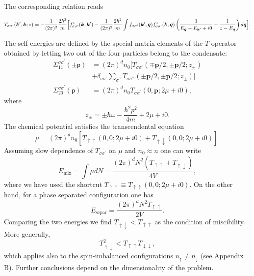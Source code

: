 \documentclass[reprint,superscriptaddress,showpacs,nofootinbib,aps,pra]{revtex4-1}
\begin{document}
The corresponding relation reads
\begin{widetext}
\begin{equation}
\label{Vert3}
T_{\sigma\sigma^\prime}(\bm k^\prime,\bm k; z)=-\frac{1}{(2\pi)^2}\frac{2\hbar^2}{m}\Bigl [f_{\sigma\sigma^\prime}^{\ast}(\bm k,\bm k^\prime)-
\frac{1}{(2\pi)^2}\frac{2\hbar^2}{m}\int f_{\sigma\sigma^\prime}(\bm k^\prime,\bm q)f_{\sigma\sigma^\prime}^{\ast}(\bm k,\bm q)\left (\frac{1}{E_{\bm q}-E_{\bm k^\prime}+i0}+\frac{1}{z-E_{\bm q}}\right)d\bm q\Bigr].
\end{equation}
\end{widetext}  
The self-energies are defined by the special matrix elements of the $T$-operator obtained by letting two out of the four particles belong to the condensate:
\begin{equation}
\label{SigmaViaTs}
\begin{split}
\Sigma^{\sigma\sigma^\prime}_{11}(\pm\mathsf p)&=(2\pi)^d n_0 [T_{\sigma\sigma^\prime}(\mp\bm p/2,\pm\bm p/2;z_\pm)\\
&+\delta_{\sigma\sigma^\prime}\sum_{\sigma^{\prime\prime}}T_{\sigma\sigma^{\prime\prime}}(\pm\bm p/2,\pm\bm p/2;z_\pm)]\\
\Sigma^{\sigma\sigma^\prime}_{20}(\mathsf p)&=(2\pi)^d n_0 T_{\sigma\sigma^\prime}(0,\bm p;2\mu+i0),
\end{split}
\end{equation}
where
\begin{equation}
z_\pm=\pm\hbar\omega-
\frac{\hbar^2 p^2}{4m}+2\mu+ i0.
\end{equation}
The chemical potential satisfies the transcendental equation
\begin{equation}
\label{mu}
\mu=(2\pi)^d n_0[T_{\uparrow\uparrow}(0,0; 2\mu+i0)+T_{\uparrow\downarrow}(0,0; 2\mu+i0)].
\end{equation}
Assuming slow dependence of  $T_{\sigma\sigma^\prime}$ on $\mu$ and $n_0\approx n$ one can write
\begin{equation}
E_{\mathrm{mix}}=\int \mu dN=\frac{(2\pi)^dN^2 (T_{\uparrow\uparrow}+T_{\uparrow\downarrow})}{4V},
\end{equation}
where we have used the shortcut $T_{\uparrow\uparrow}\equiv T_{\uparrow\uparrow}(0,0; 2\mu+i0)$. On the other hand, for a phase separated configuration one has
\begin{equation}
E_{\mathrm{separ}}=\frac{(2\pi)^dN^2 T_{\uparrow\uparrow}}{2V}.
\end{equation}
Comparing the two energies we find $T_{\uparrow\downarrow}<T_{\uparrow\uparrow}$ as the condition of miscibility. More generally,
\begin{equation}
\label{miscibility}
T_{\uparrow\downarrow}^2<T_{\uparrow\uparrow}T_{\downarrow\downarrow},
\end{equation}
which applies also to the spin-imbalanced configurations $n_\uparrow\neq n_\downarrow$ (see Appendix B). Further conclusions depend on the dimensionality of the problem.
\end{document}
